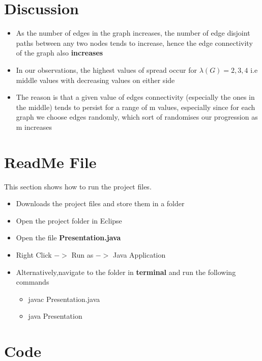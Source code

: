 \documentclass[12pt,letterpaper,titlepage,en-US]{article}
\begin{document}
\section{Discussion}
\begin{itemize}

\item As the number of edges in the graph increases, the number of edge disjoint paths between any two nodes tends to increase, hence the edge connectivity of the graph also \textbf{increases}

\item In our observations, the highest values of spread occur for $\lambda(G)=2,3,4$ i.e middle values with decreasing values on either side

\item The reason is that a given value of  edges connectivity (especially the ones in the middle) tends to persist for a range of m values, especially since for each graph we choose edges randomly, which sort of randomises our progression as m increases



\end{itemize}





  \section{ReadMe File}
  This section shows how to run the project files.
  \begin{itemize}
  \item Downloads the project files and store them in a folder
  \item Open the project folder in Eclipse
  \item Open the file \textbf{Presentation.java}
  \item Right Click $->$ Run as $->$ Java Application
  \item Alternatively,navigate to the folder in \textbf{terminal} and run the following commands
  \begin{itemize}
  \item javac Presentation.java
  \item java Presentation
  \end{itemize}
  \end{itemize}

  

 
\section{Code}
\end{document}
